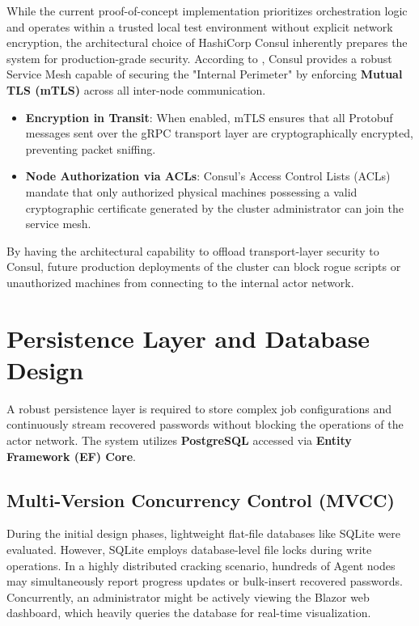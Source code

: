 While the current proof-of-concept implementation prioritizes orchestration logic and operates within a trusted local test environment without explicit network encryption, the architectural choice of HashiCorp Consul inherently prepares the system for production-grade security. According to \cite{consul_security}, Consul provides a robust Service Mesh capable of securing the "Internal Perimeter" by enforcing \textbf{Mutual TLS (mTLS)} across all inter-node communication. 

\begin{itemize}
    \item \textbf{Encryption in Transit}: When enabled, mTLS ensures that all Protobuf messages sent over the gRPC transport layer are cryptographically encrypted, preventing packet sniffing.
    \item \textbf{Node Authorization via ACLs}: Consul's Access Control Lists (ACLs) mandate that only authorized physical machines possessing a valid cryptographic certificate generated by the cluster administrator can join the service mesh. 
\end{itemize}

By having the architectural capability to offload transport-layer security to Consul, future production deployments of the cluster can block rogue scripts or unauthorized machines from connecting to the internal actor network.

\section{Persistence Layer and Database Design}

A robust persistence layer is required to store complex job configurations and continuously stream recovered passwords without blocking the operations of the actor network. The system utilizes \textbf{PostgreSQL} accessed via \textbf{Entity Framework (EF) Core}.

\subsection{Multi-Version Concurrency Control (MVCC)}
During the initial design phases, lightweight flat-file databases like SQLite were evaluated. However, SQLite employs database-level file locks during write operations. In a highly distributed cracking scenario, hundreds of Agent nodes may simultaneously report progress updates or bulk-insert recovered passwords. Concurrently, an administrator might be actively viewing the Blazor web dashboard, which heavily queries the database for real-time visualization. 

